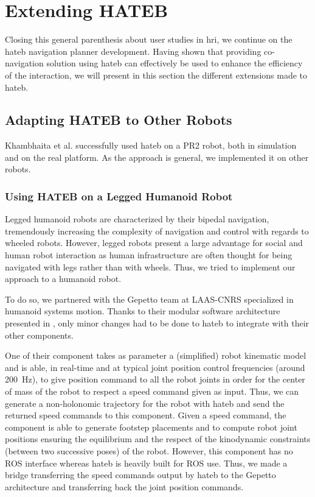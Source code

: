 \documentclass[a4paper,11pt,twoside]{StyleThese}
\begin{document}
\section{Extending HATEB}
Closing this general parenthesis about user studies in \acrshort{hri}, we continue on the \acrshort{hateb} navigation planner development. Having shown that providing co-navigation solution using \acrshort{hateb} can effectively be used to enhance the efficiency of the interaction, we will present in this section the different extensions made to \acrshort{hateb}.

\subsection{Adapting HATEB to Other Robots}
Khambhaita et al. \cite{khambhaita_head-body_2016} successfully used \acrshort{hateb} on a PR2 robot, both in simulation and on the real platform. As the approach is general, we implemented it on other robots.

\subsubsection{Using HATEB on a Legged Humanoid Robot}
Legged humanoid robots are characterized by their bipedal navigation, tremendously increasing the complexity of navigation and control with regards to wheeled robots. However, legged robots present a large advantage for social and human robot interaction as human infrastructure are often thought for being navigated with legs rather than with wheels. Thus, we tried to implement our approach to a humanoid robot.

To do so, we partnered with the Gepetto team at LAAS-CNRS specialized in humanoid systems motion. Thanks to their modular software architecture presented in \cite{stasse_modular_architecture_2008}, only minor changes had to be done to \acrshort{hateb} to integrate with their other components.

One of their component \cite{naveau_reactive_walking_2017} takes as parameter a (simplified) robot kinematic model and is able, in real-time and at typical joint position control frequencies (around 200~Hz), to give position command to all the robot joints in order for the center of mass of the robot to respect a speed command given as input. Thus, we can generate a non-holonomic trajectory for the robot with \acrshort{hateb} and send the returned speed commands to this component. Given a speed command, the component is able to generate footstep placements and to compute robot joint positions ensuring the equilibrium and the respect of the kinodynamic constraints (between two successive poses) of the robot. However, this component has no ROS interface whereas \acrshort{hateb} is heavily built for ROS use. Thus, we made a bridge transferring the speed commands output by \acrshort{hateb} to the Gepetto architecture and transferring back the joint position commands.
\end{document}
